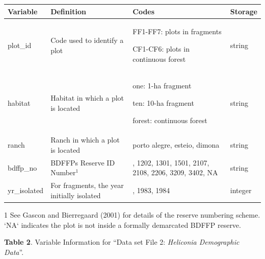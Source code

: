 \documentclass[
  man, donotrepeattitle,floatsintext]{apa6}
\begin{document}
\begin{table}
\centering
\begin{threeparttable}
\begin{tabular}{>{\raggedright\arraybackslash}p{5em}>{\raggedright\arraybackslash}p{18em}>{\raggedright\arraybackslash}p{17em}>{\raggedright\arraybackslash}p{3em}}
\toprule
\textbf{Variable} & \textbf{Definition} & \textbf{Codes} & \textbf{Storage}\\
\midrule
plot\_id & Code used to identify a plot & FF1-FF7: plots in fragments
  
CF1-CF6: plots in continuous forest & string\\
\midrule
habitat & Habitat in which a plot is located & one: 1-ha fragment
  
ten: 10-ha fragment
  
forest: continuous forest & string\\
\midrule
ranch & Ranch in which a plot is located & porto alegre, esteio, dimona & string\\
\midrule
bdffp\_no & BDFFPs Reserve ID Number$^{1}$ & 1104, 1202, 1301, 1501, 2107, 2108, 2206, 3209, 3402, NA & string\\
\midrule
yr\_isolated & For fragments, the year initially isolated & 1980, 1983, 1984 & integer\\
\bottomrule
\end{tabular}
\begin{tablenotes}
\item[1] See Gascon and Bierregaard (2001) for details of the reserve numbering scheme. `NA` indicates the plot is not inside a formally demarcated BDFFP reserve.
\end{tablenotes}
\end{threeparttable}
\end{table}

\newpage

\textbf{Table 2}. Variable Information for ``Data set File 2: \emph{Heliconia Demographic Data}''.
\renewcommand{\arraystretch}{0.5}
\end{document}
